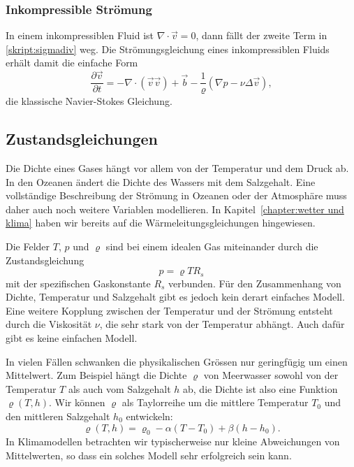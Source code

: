 \subsubsection{Inkompressible Strömung}
In einem inkompressiblen Fluid ist $\nabla\cdot\vec{v}=0$, dann fällt
der zweite Term in \eqref{skript:sigmadiv} weg.
Die Strömungsgleichung eines inkompressiblen Fluids erhält damit die
einfache Form
\begin{equation}
\frac{\partial\vec{v}}{\partial t}
=
-\nabla\cdot(\vec{v}\vec{v})
+\vec{b}
-\frac1{\varrho}(\nabla p
-\nu\Delta\vec{v}),
\label{skript:inkompressibel newtonsch}
\end{equation}
die klassische Navier-Stokes Gleichung.

\subsection{Zustandsgleichungen}
Die Dichte eines Gases hängt vor allem von der Temperatur und dem Druck ab.
In den Ozeanen ändert die Dichte des Wassers mit dem Salzgehalt.
Eine vollständige Beschreibung der Strömung in Ozeanen oder der
Atmosphäre muss daher auch noch weitere Variablen modellieren.
In Kapitel~\ref{chapter:wetter und klima} haben wir bereits auf die
Wärmeleitungsgleichungen hingewiesen.

Die Felder $T$, $p$ und $\varrho$ sind bei einem idealen Gas miteinander
durch die Zustandsgleichung
\[
p=\varrho T R_s
\]
mit der spezifischen Gaskonstante $R_s$ verbunden.
Für den Zusammenhang von Dichte, Temperatur und Salzgehalt gibt
es jedoch kein derart einfaches Modell.
Eine weitere Kopplung zwischen der Temperatur und der
Strömung entsteht durch die Viskosität $\nu$, die sehr stark
von der Temperatur abhängt.
Auch dafür gibt es keine einfachen Modell.

In vielen Fällen schwanken die physikalischen Grössen nur geringfügig
um einen Mittelwert.
Zum Beispiel hängt die Dichte $\varrho$ von Meerwasser sowohl von
der Temperatur $T$ als auch vom Salzgehalt $h$ ab, die Dichte ist
also eine Funktion $\varrho(T,h)$.
Wir können $\varrho$ als Taylorreihe um die mittlere Temperatur $T_0$
und den mittleren Salzgehalt $h_0$ entwickeln:
\[
\varrho(T,h)
=
\varrho_0 -\alpha(T-T_0) + \beta(h-h_0).
\]
In Klimamodellen betrachten wir typischerweise nur kleine Abweichungen
von Mittelwerten, so dass ein solches Modell sehr erfolgreich sein kann.

